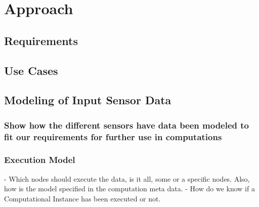 
\chapter{Approach}\label{chapter:Approach}
\section{Requirements}
\section{Use Cases}


\section{Modeling of Input Sensor Data}
\subsection{Show how the different sensors have data been modeled to fit our requirements for further use in computations}


 \subsection{Execution Model}
- Which nodes should execute the data, is it all, some  or a specific nodes. Also, how is the model specified in the computation meta data.
- How do we know if a Computational Instance has been executed or not.

